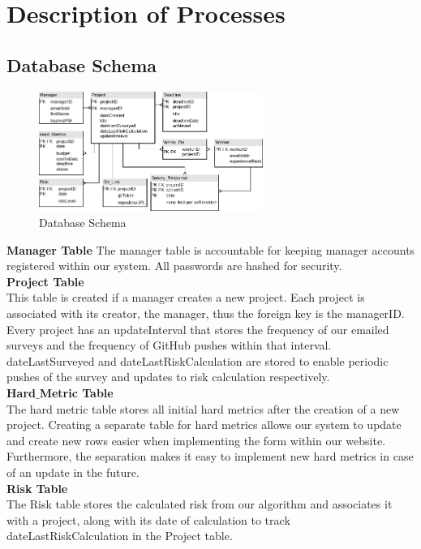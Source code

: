 \documentclass[a4paper]{article}
\theoremstyle{plain}
\theoremstyle{definition}
\theoremstyle{remark}
\begin{document}
\section*{Description of Processes}
\subsection*{Database Schema}
\begin{figure}[H]
	\centering
	\includegraphics[width=0.65\textwidth]{tables.png}
	\caption{Database Schema}
	\label{fig:tables-png}
\end{figure}
\noindent \textbf{Manager Table}
The manager table is accountable for keeping manager accounts registered within our system. All passwords are hashed for security. \\

\noindent\textbf{Project Table}\\
This table is created if a manager creates a new project. Each project is associated with its creator, the manager, thus the foreign key is the managerID. Every project has an updateInterval that stores the frequency of our emailed surveys and the frequency of GitHub pushes within that interval.  dateLastSurveyed and dateLastRiskCalculation are stored to enable periodic pushes of the survey and updates to risk calculation respectively. \\

\noindent\textbf{Hard$\_$Metric Table}\\
The hard metric table stores all initial hard metrics after the creation of a new project. Creating a separate table for hard metrics allows our system to update and create new rows easier when implementing the form within our website. Furthermore, the separation makes it easy to implement new hard metrics in case of an update in the future.\\

\noindent\textbf{Risk Table} \\
The Risk table stores the calculated risk from our algorithm and associates it with a project, along with its date of calculation to track dateLastRiskCalculation in the Project table. \\
\end{document}
